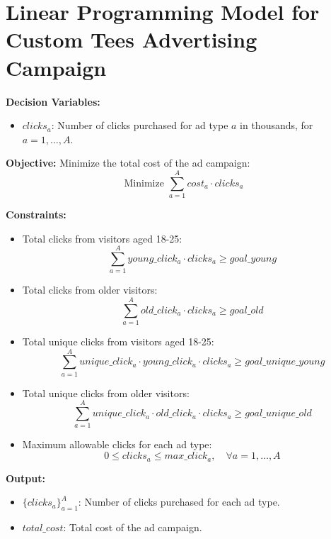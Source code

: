 \documentclass{article}
\begin{document}
\section*{Linear Programming Model for Custom Tees Advertising Campaign}

\textbf{Decision Variables:}
\begin{itemize}
    \item $clicks_{a}$: Number of clicks purchased for ad type $a$ in thousands, for $a = 1, \ldots, A$.
\end{itemize}

\textbf{Objective:}
Minimize the total cost of the ad campaign:
\[
\text{Minimize } \sum_{a=1}^{A} cost_{a} \cdot clicks_{a}
\]

\textbf{Constraints:}
\begin{itemize}
    \item Total clicks from visitors aged 18-25:
    \[
    \sum_{a=1}^{A} young\_click_{a} \cdot clicks_{a} \geq goal\_young
    \]
    
    \item Total clicks from older visitors:
    \[
    \sum_{a=1}^{A} old\_click_{a} \cdot clicks_{a} \geq goal\_old
    \]
    
    \item Total unique clicks from visitors aged 18-25:
    \[
    \sum_{a=1}^{A} unique\_click_{a} \cdot young\_click_{a} \cdot clicks_{a} \geq goal\_unique\_young
    \]
    
    \item Total unique clicks from older visitors:
    \[
    \sum_{a=1}^{A} unique\_click_{a} \cdot old\_click_{a} \cdot clicks_{a} \geq goal\_unique\_old
    \]
    
    \item Maximum allowable clicks for each ad type:
    \[
    0 \leq clicks_{a} \leq max\_click_{a}, \quad \forall a = 1, \ldots, A
    \]
\end{itemize}

\textbf{Output:}
\begin{itemize}
    \item $\{clicks_{a}\}_{a=1}^{A}$: Number of clicks purchased for each ad type.
    \item $total\_cost$: Total cost of the ad campaign.
\end{itemize}
\end{document}
